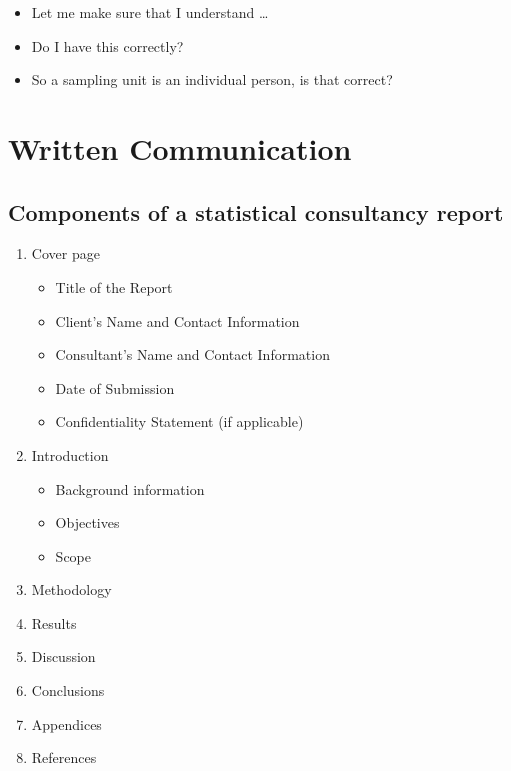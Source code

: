 \documentclass[
  letterpaper,
  DIV=11,
  numbers=noendperiod]{scrreprt}
\begin{document}
\begin{itemize}
\item
  Let me make sure that I understand \ldots{}
\item
  Do I have this correctly?
\item
  So a sampling unit is an individual person, is that correct?
\end{itemize}


\chapter{Written Communication}\label{written-communication}

\section{Components of a statistical consultancy
report}\label{components-of-a-statistical-consultancy-report}

\begin{enumerate}
\def\labelenumi{\arabic{enumi}.}
\item
  Cover page

  \begin{itemize}
  \item
    Title of the Report
  \item
    Client's Name and Contact Information
  \item
    Consultant's Name and Contact Information
  \item
    Date of Submission
  \item
    Confidentiality Statement (if applicable)
  \end{itemize}
\item
  Introduction

  \begin{itemize}
  \item
    Background information
  \item
    Objectives
  \item
    Scope
  \end{itemize}
\item
  Methodology
\item
  Results
\item
  Discussion
\item
  Conclusions
\item
  Appendices
\item
  References
\end{enumerate}
\end{document}
